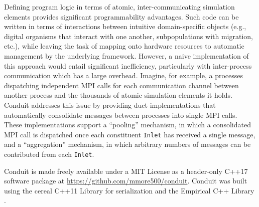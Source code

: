 Defining program logic in terms of atomic, inter-communicating simulation elements provides significant programmability advantages.
Such code can be written in terms of interactions between intuitive domain-specific objects (e.g., digital organisms that interact with one another, subpopulations with migration, etc.), while leaving the task of mapping onto hardware resources to automatic management by the underlying framework.
However, a naive implementation of this approach would entail significant inefficiency, particularly with inter-process communication which has a large overhead.
Imagine, for example, a processes dispatching independent MPI calls for each communication channel between another process and the thousands of atomic simulation elements it holds.
Conduit addresses this issue by providing duct implementations that automatically consolidate messages between processes into single MPI calls.
These implementations support a ``pooling'' mechanism, in which a consolidated MPI call is dispatched once each constituent \texttt{Inlet} has received a single message, and a ``aggregation'' mechanism, in which arbitrary numbers of messages can be contributed from each \texttt{Inlet}.

Conduit is made freely available under a MIT License as a header-only C++17 software package at \url{https://github.com/mmore500/conduit}.
Conduit was built using the cereal C++11 Library for serialization \cite{voorhies2017cereal} and the Empirical C++ Library \cite{charles_ofria_2019_2575607}.
